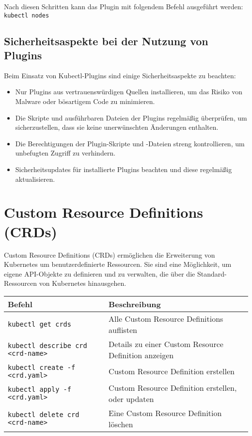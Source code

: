 Nach diesen Schritten kann das Plugin mit folgendem Befehl ausgeführt werden:\\
\texttt{kubectl nodes}

\subsection{Sicherheitsaspekte bei der Nutzung von Plugins}
Beim Einsatz von Kubectl-Plugins sind einige Sicherheitsaspekte zu beachten:

\begin{itemize}
    \item Nur Plugins aus vertrauenswürdigen Quellen installieren, um das Risiko von Malware oder bösartigem Code zu minimieren.
    \item Die Skripte und ausführbaren Dateien der Plugins regelmäßig überprüfen, um sicherzustellen, dass sie keine unerwünschten Änderungen enthalten.
    \item Die Berechtigungen der Plugin-Skripte und -Dateien streng kontrollieren, um unbefugten Zugriff zu verhindern.
    \item Sicherheitsupdates für installierte Plugins beachten und diese regelmäßig aktualisieren.
\end{itemize}

\section{Custom Resource Definitions (CRDs)}
\label{sec:crd}
Custom Resource Definitions (CRDs) ermöglichen die Erweiterung von Kubernetes um benutzerdefinierte Ressourcen. Sie sind eine Möglichkeit, um eigene API-Objekte zu definieren und zu verwalten, die über die Standard-Ressourcen von Kubernetes hinausgehen.\\

\noindent
\begin{tabular}{
|p{}|p{}|}
\hline
\textbf{Befehl} & \textbf{Beschreibung} \\
\hline
\texttt{kubectl get crds} & Alle Custom Resource Definitions auflisten \\
\texttt{kubectl describe crd <crd-name>} & Details zu einer Custom Resource Definition anzeigen \\
\texttt{kubectl create -f <crd.yaml>} & Custom Resource Definition erstellen\\
\texttt{kubectl apply -f <crd.yaml>} & Custom Resource Definition erstellen, oder updaten\\
\texttt{kubectl delete crd <crd-name>} & Eine Custom Resource Definition löschen \\
\hline
\end{tabular}

